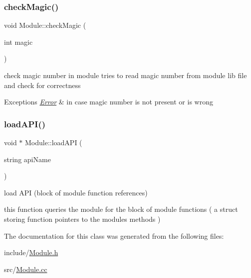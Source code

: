 \subsubsection{\texorpdfstring{check\+Magic()}{checkMagic()}}
{\footnotesize\ttfamily void Module\+::check\+Magic (\begin{DoxyParamCaption}\item[{int}]{magic }\end{DoxyParamCaption})}



check magic number in module tries to read magic number from module lib file and check for correctness 


\begin{DoxyExceptions}{Exceptions}
{\em \hyperlink{classError}{Error}} & in case magic number is not present or is wrong \\
\hline
\end{DoxyExceptions}
\mbox{\label{classModule_a4a9a9aa2518c2486e9bcb309277a1bf1}} 
\subsubsection{\texorpdfstring{load\+A\+P\+I()}{loadAPI()}}
{\footnotesize\ttfamily void $\ast$ Module\+::load\+A\+PI (\begin{DoxyParamCaption}\item[{string}]{api\+Name }\end{DoxyParamCaption})}



load A\+PI (block of module function references) 

this function queries the module for the block of module functions ( a struct storing function pointers to the module\textquotesingle{}s methods ) 

The documentation for this class was generated from the following files\+:\begin{DoxyCompactItemize}
\item 
include/\hyperlink{Module_8h}{Module.\+h}\item 
src/\hyperlink{Module_8cc}{Module.\+cc}\end{DoxyCompactItemize}
